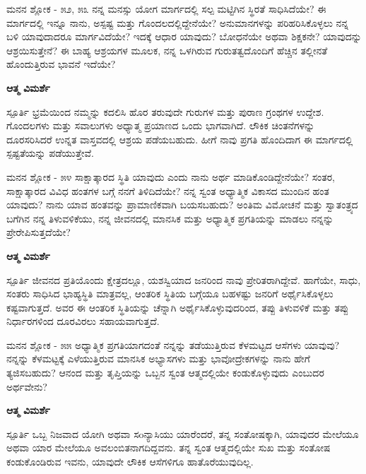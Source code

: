 \newpage
\begin{mananam}{\mananamfont \large{ಮನನ ಶ್ಲೋಕ - ೫೨, ೫೩}}
\footnotesize \mananamtext ನನ್ನ ಮನಸ್ಸು ಯೋಗ ಮಾರ್ಗದಲ್ಲಿ ಸಲ್ಪ ಮಟ್ಟಿಗಿನ ಸ್ಥಿರತೆ ಸಾಧಿಸಿದೆಯೇ? ಈ ಮಾರ್ಗದಲ್ಲಿ ಇನ್ನೂ ನಾನು, ಅಸ್ಪಷ್ಟ  ಮತ್ತು ಗೊಂದಲದಲ್ಲಿದ್ದೇನೆಯೇ? ಅನುಮಾನಗಳನ್ನು ಪರಿಹರಿಸಿಕೊಳ್ಳಲು ನನ್ನ ಬಳಿ ಯಾವುದಾದರೂ ಮಾರ್ಗವಿದೆಯೇ? ಇದಕ್ಕೆ ಆಧಾರ ಯಾವುದು? ಬೋಧನೆಯೇ ಅಥವಾ ಶಿಕ್ಷಕನೇ? ಯಾವುದನ್ನು ಆಶ್ರಯಿಸುತ್ತೇನೆ? ಈ ಬಾಹ್ಯ ಆಶ್ರಯಗಳ ಮೂಲಕ, ನನ್ನ ಒಳಗಿರುವ ಗುರುತತ್ವದೊಂದಿಗೆ ಹೆಚ್ಚಿನ ತಲ್ಲೀನತೆ ಹೊಂದುತ್ತಿರುವ ಭಾವನೆ ಇದೆಯೇ?
\end{mananam}
\WritingHand\enspace\textbf{ಆತ್ಮ ವಿಮರ್ಶೆ}
\begin{inspiration}{\mananamfont \large ಸ್ಪೂರ್ತಿ}
\footnotesize \mananamtext ಭ್ರಮೆಯಿಂದ ನಮ್ಮನ್ನು ಕದಲಿಸಿ ಹೊರ ತರುವುದೇ ಗುರುಗಳ ಮತ್ತು ಪುರಾಣ ಗ್ರಂಥಗಳ ಉದ್ದೇಶ. ಗೊಂದಲಗಳು ಮತ್ತು ಸವಾಲುಗಳು ಅಧ್ಯಾತ್ಮ ಪ್ರಯಾಣದ ಒಂದು ಭಾಗವಾಗಿದೆ. ಲೌಕಿಕ ಚಿಂತನೆಗಳನ್ನು ದೂರಸರಿಸಿದರೆ ಉನ್ನತ ವಾಸ್ತವದಲ್ಲಿ ಆಶ್ರಯ ಪಡೆಯಬಹುದು. ಹೀಗೆ ನಾವು ಪ್ರಗತಿ ಹೊಂದಿದಾಗ ಈ ಮಾರ್ಗದಲ್ಲಿ ಸ್ಪಷ್ಟತೆಯನ್ನು ಪಡೆಯುತ್ತೇವೆ.
\end{inspiration}
\newpage

\begin{mananam}{\mananamfont \large ಮನನ ಶ್ಲೋಕ - ೫೪}
\footnotesize \mananamtext ಸಾಕ್ಷಾತ್ಕಾರದ ಸ್ಥಿತಿ ಯಾವುದು ಎಂದು ನಾನು ಅರ್ಥ ಮಾಡಿಕೊಂಡಿದ್ದೇನೆಯೇ? ಸಂತರ,  ಸಾಕ್ಷಾತ್ಕಾರದ  ವಿವಿಧ ಹಂತಗಳ ಬಗ್ಗೆ ನನಗೆ ತಿಳಿದಿದೆಯೇ? ನನ್ನ ಸ್ವಂತ ಅಧ್ಯಾತ್ಮಿಕ ವಿಕಾಸದ ಮುಂದಿನ ಹಂತ ಯಾವುದು? ನಾನು ಯಾವ ಹಂತವನ್ನು ಪ್ರಾಮಾಣಿಕವಾಗಿ ಬಯಸಬಹುದು? ಅಂತಿಮ ವಿಮೋಚನೆ ಮತ್ತು ಸ್ವಾತಂತ್ರ್ಯದ ಬಗೆಗಿನ ನನ್ನ ತಿಳುವಳಿಕೆಯು,  ನನ್ನ ಜೀವನದಲ್ಲಿ ಮಾನಸಿಕ ಮತ್ತು ಅಧ್ಯಾತ್ಮಿಕ ಪ್ರಗತಿಯನ್ನು ಮಾಡಲು  ನನ್ನನ್ನು ಪ್ರೇರೇಪಿಸುತ್ತದೆಯೇ?
\end{mananam}
\WritingHand\enspace\textbf{ಆತ್ಮ ವಿಮರ್ಶೆ}
\begin{inspiration}{\mananamfont \large ಸ್ಪೂರ್ತಿ}
\footnotesize \mananamtext ಜೀವನದ ಪ್ರತಿಯೊಂದು ಕ್ಷೇತ್ರದಲ್ಲೂ,  ಯಶಸ್ವಿಯಾದ ಜನರಿಂದ ನಾವು ಪ್ರೇರಿತರಾಗಿದ್ದೇವೆ. ಹಾಗೆಯೇ, ಸಾಧು, ಸಂತರು ಸಾಧಿಸಿದ ಭಾಹ್ಯಸ್ಥಿತಿ ಮಾತ್ರವಲ್ಲ, ಆಂತರಿಕ ಸ್ಥಿತಿಯ ಬಗ್ಗೆಯೂ ಬಹಳಷ್ಟು ಜನರಿಗೆ ಅರ್ಥೈಸಿಕೊಳ್ಳಲು ಕಷ್ಟವಾಗುತ್ತದೆ. ಅವರ ಈ ಆಂತರಿಕ ಸ್ಥಿತಿಯನ್ನು ಚೆನ್ನಾಗಿ ಅರ್ಥೈಸಿಕೊಳ್ಳುವುದರಿಂದ, ತಪ್ಪು ತಿಳುವಳಿಕೆ ಮತ್ತು ತಪ್ಪು ನಿರ್ಧಾರಗಳಿಂದ ದೂರವಿರಲು ಸಹಾಯವಾಗುತ್ತದೆ.
\end{inspiration}
\newpage

\begin{mananam}{\mananamfont \large ಮನನ ಶ್ಲೋಕ - ೫೫}
\footnotesize \mananamtext ಅಧ್ಯಾತ್ಮಿಕ ಪ್ರಗತಿಯಾಗದಂತೆ ನನ್ನನ್ನು ತಡೆಯುತ್ತಿರುವ ಕೆಳಮಟ್ಟದ ಆಸೆಗಳು ಯಾವುವು? ನನ್ನನ್ನು ಕೆಳಮಟ್ಟಕ್ಕೆ ಎಳೆಯುತ್ತಿರುವ ಮಾನಸಿಕ ಅಭ್ಯಾಸಗಳು ಮತ್ತು ಭಾವೋದ್ರೇಕಗಳನ್ನು   ನಾನು ಹೇಗೆ ತ್ಯಜಿಸಬಹುದು? ಆನಂದ ಮತ್ತು ತೃಪ್ತಿಯನ್ನು ಒಬ್ಬನ ಸ್ವಂತ ಆತ್ಮದಲ್ಲಿಯೇ ಕಂಡುಕೊಳ್ಳುವುದು ಎಂಬುದರ ಅರ್ಥವೇನು?
\end{mananam}
\WritingHand\enspace\textbf{ಆತ್ಮ ವಿಮರ್ಶೆ}
\begin{inspiration}{\mananamfont \large ಸ್ಪೂರ್ತಿ}
\footnotesize \mananamtext  ಒಬ್ಬ ನಿಜವಾದ ಯೋಗಿ ಅಥವಾ ಸoನ್ಯಾಸಿಯು ಯಾರೆಂದರೆ, ತನ್ನ ಸಂತೋಷಕ್ಕಾಗಿ, ಯಾವುದರ ಮೇಲೆಯೂ ಅಥವಾ ಯಾರ ಮೇಲೆಯೂ ಅವಲಂಬಿತನಾಗದಿದ್ದವನು. ತನ್ನ ಸ್ವಂತ ಆತ್ಮದಲ್ಲಿಯೇ ಸುಖ ಮತ್ತು ಸಂತೋಷ ಕಂಡುಕೊಂಡಿರುವ ಇವನು, ಯಾವುದೇ ಲೌಕಿಕ ಆಸೆಗಳಿಗೂ ಹಾತೊರೆಯುವುದಿಲ್ಲ.
\end{inspiration}

